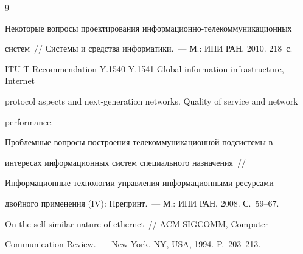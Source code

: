 {\small\frenchspacing


{%




\begin{thebibliography}{9}









Некоторые вопросы проектирования информационно-телекоммуникационных 


систем~/\!\!/ Системы и средства информатики.~--- М.: ИПИ РАН, 2010. 218~с.







ITU-T Recommendation Y.1540-Y.1541 Global information infrastructure, Internet 


protocol aspects and next-generation networks. Quality of service and network 


performance.









Проблемные вопросы построения телекоммуникационной подсистемы в 


интересах информационных систем специального назначения~/\!\!/ 


Информационные технологии управления информационными ресурсами 


двойного применения (IV): Препринт.~--- М.: ИПИ РАН, 2008. С.~59--67.





\label{end\stat}









On the self-similar nature of ethernet~/\!\!/ ACM SIGCOMM, Computer 


Communication Review.~--- New York, NY, USA, 1994. P.~203--213.


 \end{thebibliography}


}


}


